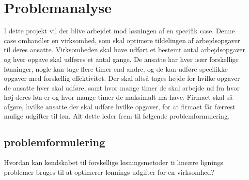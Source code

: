 \section{Problemanalyse}
I dette projekt vil der blive arbejdet mod løsningen af en specifik case. 
Denne case omhandler en virksomhed, som skal optimere tildelingen af arbejdsopgaver til deres ansatte.
Virksomheden skal have udført et bestemt antal arbejdsopgaver og hver opgave skal udføres et antal gange. 
De ansatte har hver især forskellige lønninger, nogle kan tage flere timer end andre, og de kan udføre specifikke opgaver med forskellig effektivitet.
Der skal altså tages højde for hvilke opgaver de ansatte hver skal udføre, samt hvor mange timer de skal arbejde ud fra hvor høj deres løn er og hvor mange timer de maksimalt må have.
Firmaet skal så afgøre, hvilke ansatte der skal udføre hvilke opgaver, for at firmaet får færrest mulige udgifter til løn. 
Alt dette leder frem til følgende problemformulering.

\subsection{problemformulering}
Hvordan kan kendskabet til forskellige løsningsmetoder ti lineære lignings problemer bruges til at optimerer lønnings udgifter for en virksomhed?
